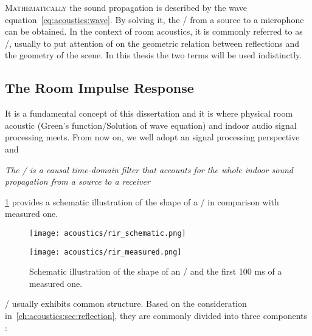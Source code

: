 \textsc{Mathematically} the sound propagation is described by the wave equation~\eqref{eq:acoustics:wave}.
By solving it, the \AIRdef/
from a source to a microphone can be obtained.
In the context of room acoustics, it is commonly referred to as \RIRdef/, usually to put attention of
on the geometric relation between reflections and the geometry of the scene.
In this thesis the two terms will be used indistinctly.

\subsection{The Room Impulse Response}\label{ch:acoustics:subsec:rir}
It is a fundamental concept of this dissertation and it is where physical room acoustic
(Green's function/Solution of wave equation) and indoor audio signal processing meets.
From now on, we well adopt an signal processing perspective and
\begin{center}
\textit{The \RIR/ is a causal time-domain filter that accounts for the whole indoor sound propagation
from a source to a receiver}
\end{center}
\cref{fig:acoustics:rir} provides a schematic illustration of the shape of a \RIR/ in comparison with measured one.
\begin{figure}[h]
    \centering
    \begin{minipage}[b]{.5\textwidth}
        \centering
        \texttt{[image: acoustics/rir\_schematic.png]}
    \end{minipage}%
    \begin{minipage}[b]{.5\textwidth}
        \centering
        \texttt{[image: acoustics/rir\_measured.png]}
    \end{minipage}
    \caption{Schematic illustration of the shape of an \RIR/ and the first 100 ms of a measured one.}
    \label{fig:acoustics:rir}
\end{figure}

\RIRs/ usually exhibits common structure.
Based on the consideration in~\cref{ch:acoustics:sec:reflection},
they are commonly divided into three components :

